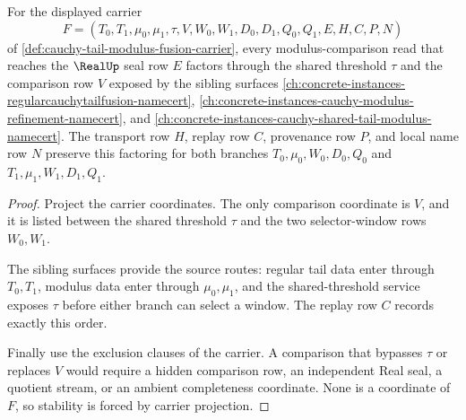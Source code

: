 \begin{theorem}
\label{thm:cauchy-tail-modulus-fusion-threshold-comparison-stability}
For the displayed carrier
$$
F=(T_0,T_1,\mu_0,\mu_1,\tau,V,W_0,W_1,D_0,D_1,Q_0,Q_1,E,H,C,P,N)
$$
of \autoref{def:cauchy-tail-modulus-fusion-carrier}, every modulus-comparison read that reaches the $\RealUp$ seal row $E$ factors through the shared threshold $\tau$ and the comparison row $V$ exposed by the sibling surfaces \autoref{ch:concrete-instances-regularcauchytailfusion-namecert}, \autoref{ch:concrete-instances-cauchy-modulus-refinement-namecert}, and \autoref{ch:concrete-instances-cauchy-shared-tail-modulus-namecert}. The transport row $H$, replay row $C$, provenance row $P$, and local name row $N$ preserve this factoring for both branches $T_0,\mu_0,W_0,D_0,Q_0$ and $T_1,\mu_1,W_1,D_1,Q_1$.
\end{theorem}
\begin{proof}
Project the carrier coordinates. The only comparison coordinate is $V$, and it is listed between the shared threshold $\tau$ and the two selector-window rows $W_0,W_1$.

The sibling surfaces provide the source routes: regular tail data enter through $T_0,T_1$, modulus data enter through $\mu_0,\mu_1$, and the shared-threshold service exposes $\tau$ before either branch can select a window. The replay row $C$ records exactly this order.

Finally use the exclusion clauses of the carrier. A comparison that bypasses $\tau$ or replaces $V$ would require a hidden comparison row, an independent Real seal, a quotient stream, or an ambient completeness coordinate. None is a coordinate of $F$, so stability is forced by carrier projection.
\end{proof}

